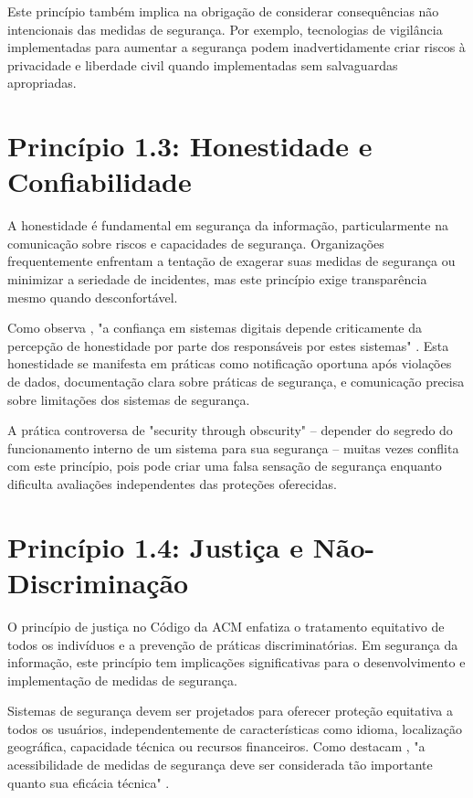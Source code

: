 Este princípio também implica na obrigação de considerar consequências não intencionais das medidas de segurança. Por exemplo, tecnologias de vigilância implementadas para aumentar a segurança podem inadvertidamente criar riscos à privacidade e liberdade civil quando implementadas sem salvaguardas apropriadas.

\section{Princípio 1.3: Honestidade e Confiabilidade}

A honestidade é fundamental em segurança da informação, particularmente na comunicação sobre riscos e capacidades de segurança. Organizações frequentemente enfrentam a tentação de exagerar suas medidas de segurança ou minimizar a seriedade de incidentes, mas este princípio exige transparência mesmo quando desconfortável.

Como observa \citeauthor{friedman2008trust}, "a confiança em sistemas digitais depende criticamente da percepção de honestidade por parte dos responsáveis por estes sistemas" \cite{friedman2008trust}. Esta honestidade se manifesta em práticas como notificação oportuna após violações de dados, documentação clara sobre práticas de segurança, e comunicação precisa sobre limitações dos sistemas de segurança.

A prática controversa de "security through obscurity" – depender do segredo do funcionamento interno de um sistema para sua segurança – muitas vezes conflita com este princípio, pois pode criar uma falsa sensação de segurança enquanto dificulta avaliações independentes das proteções oferecidas.

\section{Princípio 1.4: Justiça e Não-Discriminação}

O princípio de justiça no Código da ACM enfatiza o tratamento equitativo de todos os indivíduos e a prevenção de práticas discriminatórias. Em segurança da informação, este princípio tem implicações significativas para o desenvolvimento e implementação de medidas de segurança.

Sistemas de segurança devem ser projetados para oferecer proteção equitativa a todos os usuários, independentemente de características como idioma, localização geográfica, capacidade técnica ou recursos financeiros. Como destacam \citeauthor{abebe2020roles}, "a acessibilidade de medidas de segurança deve ser considerada tão importante quanto sua eficácia técnica" \cite{abebe2020roles}.

